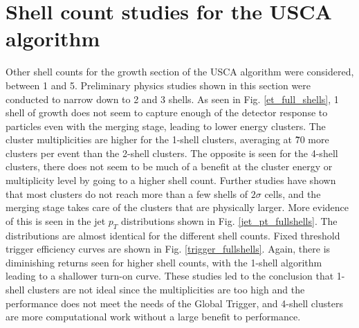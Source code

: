 \appendix
\renewcommand\thefigure{\thechapter.\arabic{figure}}
\renewcommand\thetable{\thechapter.\arabic{table}}

\chapter{Shell count studies for the USCA algorithm}\label{shell_studies}

Other shell counts for the growth section of the USCA algorithm were considered, between 1 and 5.
Preliminary physics studies shown in this section were conducted to narrow down to 2 and 3 shells.
As seen in Fig. \ref{et_full_shells}, 1 shell of growth does not seem to capture enough of the detector response to particles even with the merging stage, leading to lower energy clusters.
The cluster multiplicities are higher for the 1-shell clusters, averaging at \~70 more clusters per event than the 2-shell clusters.
The opposite is seen for the 4-shell clusters, there does not seem to be much of a benefit at the cluster energy or multiplicity level by going to a higher shell count.
Further studies have shown that most clusters do not reach more than a few shells of $2\sigma$ cells, and the merging stage takes care of the clusters that are physically larger.
More evidence of this is seen in the jet $p_T$ distributions shown in Fig. \ref{jet_pt_fullshells}.
The distributions are almost identical for the different shell counts.
Fixed threshold trigger efficiency curves are shown in Fig. \ref{trigger_fullshells}.
Again, there is diminishing returns seen for higher shell counts, with the 1-shell algorithm leading to a shallower turn-on curve.
These studies led to the conclusion that 1-shell clusters are not ideal since the multiplicities are too high and the performance does not meet the needs of the Global Trigger, and 4-shell clusters are more computational work without a large benefit to performance.

